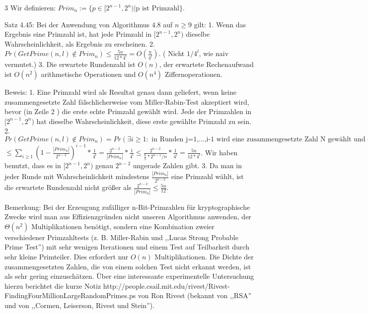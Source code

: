 \documentclass[a4paper]{article}
\begin{document}
\begin{multicols}{3}
        Wir definieren: $Prim_n:=\{p\in [2^{n-1}, 2^n)| \text{p ist Primzahl}\}$.

        Satz 4.45: Bei der Anwendung von Algorithmus 4.8 auf $n\geq 9$ gilt:
        1. Wenn das Ergebnis eine Primzahl ist, hat jede Primzahl in $[2^{n-1}, 2^n)$ dieselbe Wahrscheinlichkeit, als Ergebnis zu erscheinen.
        2. $Pr(GetPrime(n,l)\not\in Prim_n)\leq \frac{5n}{12*4^l}=O(\frac{n}{4^l})$. ( Nicht $1/4^l$, wie naiv vermutet.)
        3. Die erwartete Rundenzahl ist $O(n)$, der erwartete Rechenaufwand ist $O(n^2)$ arithmetische Operationen und $O(n^4)$ Ziffernoperationen.

        Beweis:
        1. Eine Primzahl wird als Resultat genau dann geliefert, wenn keine zusammengesetzte Zahl fälschlicherweise vom Miller-Rabin-Test akzeptiert wird, bevor (in Zeile 2 ) die erste echte Primzahl gewählt wird. Jede der Primzahlen in $[2^{n-1}, 2^n)$ hat dieselbe Wahrscheinlichkeit, diese erste gewählte Primzahl zu sein.
        2. $Pr(GetPrime(n,l)\not\in Prim_n)= Pr(\exists i\geq 1 :\text{ in Runden j=1,...,i-1 wird eine zusammengesetzte Zahl N gewählt und erkannt}\wedge\text{in Runde i wird zusammengesetzte Zahl N gewählt und der iterierte MiRa-Test auf N liefert 0})$ $\leq\sum_{i\geq 1} (1 -\frac{|Prim_n|}{2^{n-2}})^{i-1}*\frac{1}{4^l} = \frac{2^{n-2}}{|Prim_n|} *\frac{1}{4^l} \leq \frac{2^{n-2}}{\frac{6}{5} *2^{n-1} /n}*\frac{1}{4^l} = \frac{5n}{12 * 4^l}$. Wir haben benutzt, dass es in $[2^{n-1}, 2^n)$ genau $2^{n-2}$ ungerade Zahlen gibt.
        3. Da man in jeder Runde mit Wahrscheinlichkeit mindestens $\frac{|Prim_n|}{2^{n-2}}$ eine Primzahl wählt, ist die erwartete Rundenzahl nicht größer als $\frac{2^{n-2}}{|Prim_n|} \leq \frac{5n}{12}$.

        Bemerkung: Bei der Erzeugung zufälliger n-Bit-Primzahlen für kryptographische Zwecke wird man aus Effizienzgründen nicht unseren Algorithmus anwenden, der $\Theta (n^2)$ Multiplikationen benötigt, sondern eine Kombination zweier verschiedener Primzahltests (z. B. Miller-Rabin und ,,Lucas Strong Probable Prime Test'') mit sehr wenigen Iterationen und einem Test auf Teilbarkeit durch sehr kleine Primteiler. Dies erfordert nur $O(n)$ Multiplikationen. Die Dichte der zusammengesetzten Zahlen, die von einem solchen Test nicht erkannt werden, ist als sehr gering einzuschätzen. Über eine interessante experimentelle Untersuchung hierzu berichtet die kurze Notiz http://people.csail.mit.edu/rivest/Rivest-FindingFourMillionLargeRandomPrimes.ps von Ron Rivest (bekannt von ,,RSA'' und von ,,Cormen, Leiserson, Rivest und Stein'').


\end{multicols}
\end{document}
